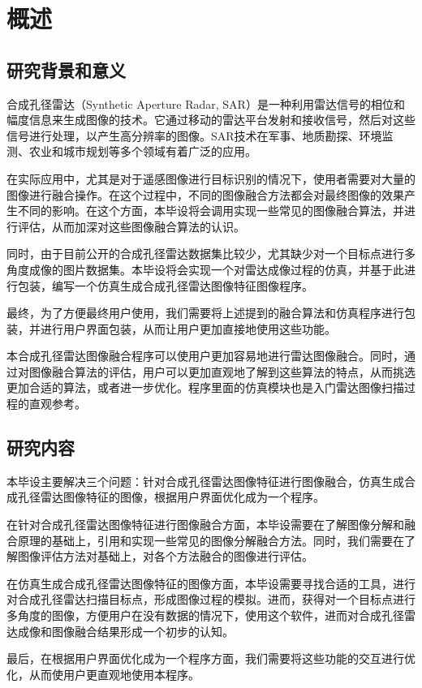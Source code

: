 \documentclass{xduugthesis}
\begin{document}
\chapter{概述}
\section{研究背景和意义}
合成孔径雷达（Synthetic Aperture Radar, SAR）是一种利用雷达信号的相位和幅度信息来生成图像的技术。它通过移动的雷达平台发射和接收信号，然后对这些信号进行处理，以产生高分辨率的图像。SAR技术在军事、地质勘探、环境监测、农业和城市规划等多个领域有着广泛的应用。\par
在实际应用中，尤其是对于遥感图像进行目标识别的情况下，使用者需要对大量的图像进行融合操作。在这个过程中，不同的图像融合方法都会对最终图像的效果产生不同的影响。在这个方面，本毕设将会调用实现一些常见的图像融合算法，并进行评估，从而加深对这些图像融合算法的认识。\par
同时，由于目前公开的合成孔径雷达数据集比较少，尤其缺少对一个目标点进行多角度成像的图片数据集。本毕设将会实现一个对雷达成像过程的仿真，并基于此进行包装，编写一个仿真生成合成孔径雷达图像特征图像程序。\par
最终，为了方便最终用户使用，我们需要将上述提到的融合算法和仿真程序进行包装，并进行用户界面包装，从而让用户更加直接地使用这些功能。\par
本合成孔径雷达图像融合程序可以使用户更加容易地进行雷达图像融合。同时，通过对图像融合算法的评估，用户可以更加直观地了解到这些算法的特点，从而挑选更加合适的算法，或者进一步优化。程序里面的仿真模块也是入门雷达图像扫描过程的直观参考。\par
\section{研究内容}
本毕设主要解决三个问题：针对合成孔径雷达图像特征进行图像融合，仿真生成合成孔径雷达图像特征的图像，根据用户界面优化成为一个程序。\par
在针对合成孔径雷达图像特征进行图像融合方面，本毕设需要在了解图像分解和融合原理的基础上，引用和实现一些常见的图像分解融合方法。同时，我们需要在了解图像评估方法对基础上，对各个方法融合的图像进行评估。\par
在仿真生成合成孔径雷达图像特征的图像方面，本毕设需要寻找合适的工具，进行对合成孔径雷达扫描目标点，形成图像过程的模拟。进而，获得对一个目标点进行多角度的图像，方便用户在没有数据的情况下，使用这个软件，进而对合成孔径雷达成像和图像融合结果形成一个初步的认知。\par
最后，在根据用户界面优化成为一个程序方面，我们需要将这些功能的交互进行优化，从而使用户更直观地使用本程序。
\end{document}
